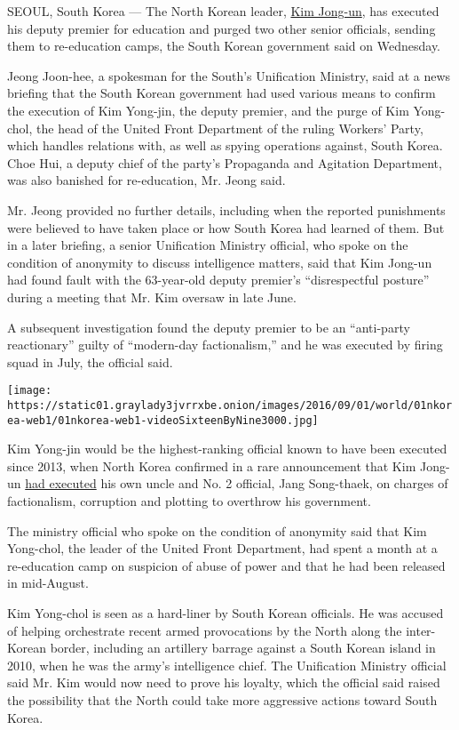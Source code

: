 SEOUL, South Korea --- The North Korean leader,
\href{http://topics.nytimes3xbfgragh.onion/top/reference/timestopics/people/k/kim_jongun/index.html?inline=nyt-per}{Kim
Jong-un}, has executed his deputy premier for education and purged two
other senior officials, sending them to re-education camps, the South
Korean government said on Wednesday.

Jeong Joon-hee, a spokesman for the South's Unification Ministry, said
at a news briefing that the South Korean government had used various
means to confirm the execution of Kim Yong-jin, the deputy premier, and
the purge of Kim Yong-chol, the head of the United Front Department of
the ruling Workers' Party, which handles relations with, as well as
spying operations against, South Korea. Choe Hui, a deputy chief of the
party's Propaganda and Agitation Department, was also banished for
re-education, Mr. Jeong said.

Mr. Jeong provided no further details, including when the reported
punishments were believed to have taken place or how South Korea had
learned of them. But in a later briefing, a senior Unification Ministry
official, who spoke on the condition of anonymity to discuss
intelligence matters, said that Kim Jong-un had found fault with the
63-year-old deputy premier's ``disrespectful posture'' during a meeting
that Mr. Kim oversaw in late June.

A subsequent investigation found the deputy premier to be an
``anti-party reactionary'' guilty of ``modern-day factionalism,'' and he
was executed by firing squad in July, the official said.

\texttt{[image: https://static01.graylady3jvrrxbe.onion/images/2016/09/01/world/01nkorea-web1/01nkorea-web1-videoSixteenByNine3000.jpg]}

Kim Yong-jin would be the highest-ranking official known to have been
executed since 2013, when North Korea confirmed in a rare announcement
that Kim Jong-un
\href{http://www.nytimes3xbfgragh.onion/2013/12/13/world/asia/north-korea-says-uncle-of-executed.html}{had
executed} his own uncle and No. 2 official, Jang Song-thaek, on charges
of factionalism, corruption and plotting to overthrow his government.

The ministry official who spoke on the condition of anonymity said that
Kim Yong-chol, the leader of the United Front Department, had spent a
month at a re-education camp on suspicion of abuse of power and that he
had been released in mid-August.

Kim Yong-chol is seen as a hard-liner by South Korean officials. He was
accused of helping orchestrate recent armed provocations by the North
along the inter-Korean border, including an artillery barrage against a
South Korean island in 2010, when he was the army's intelligence chief.
The Unification Ministry official said Mr. Kim would now need to prove
his loyalty, which the official said raised the possibility that the
North could take more aggressive actions toward South Korea.

